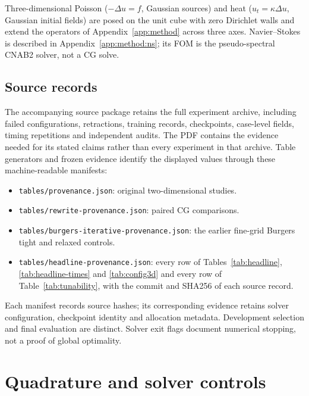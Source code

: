 \begin{table}[htbp]
\centering
\caption{Three-dimensional configurations, read from the run records.
Domains are the unit cube with homogeneous Dirichlet data, except
Navier--Stokes, which is periodic.}
\label{tab:config3d}
\resizebox{\linewidth}{!}{}
\end{table}

Three-dimensional Poisson ($-\Delta u=f$, Gaussian sources) and heat
($u_t=\kappa\Delta u$, Gaussian initial fields) are posed on the unit
cube with zero Dirichlet walls and extend the operators of
Appendix~\ref{app:method} across three axes. Navier--Stokes is described in
Appendix~\ref{app:method:ns}; its FOM is the pseudo-spectral CNAB2 solver,
not a CG solve.

\subsection{Source records}
The accompanying source package retains the full experiment archive,
including failed configurations, retractions, training records, checkpoints,
case-level fields, timing repetitions and independent audits. The PDF
contains the evidence needed for its stated claims rather than every
experiment in that archive. Table generators and frozen evidence identify
the displayed values through these machine-readable manifests:
\begin{itemize}
\item \texttt{tables/provenance.json}: original two-dimensional studies.
\item \texttt{tables/rewrite-provenance.json}: paired CG comparisons.
\item \texttt{tables/burgers-iterative-provenance.json}: the earlier
fine-grid Burgers tight and relaxed controls.
\item \texttt{tables/headline-provenance.json}: every row of
Tables~\ref{tab:headline}, \ref{tab:headline-times} and
\ref{tab:config3d} and every row of Table~\ref{tab:tunability}, with the
commit and SHA256 of each source record.
\end{itemize}
Each manifest records source hashes; its corresponding evidence retains
solver configuration, checkpoint identity and allocation metadata. Development
selection and final evaluation are distinct. Solver exit flags document
numerical stopping, not a proof of global optimality.



\section{Quadrature and solver controls}
\label{app:sealed-ladder}

